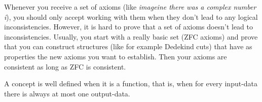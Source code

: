 Whenever you receive a set of axioms (like \emph{imageine there was a complex number i}), you should only accept working with them when they don't lead to any logical inconsistencies. However, it is hard to prove that a set of axioms doesn't lead to inconsistencies. Usually, you start with a really basic set (ZFC axioms) and prove that you can construct structures (like for example Dedekind cuts) that have as properties the new axioms you want to establish. Then your axioms are consistent as long as ZFC is consistent. 

A concept is well defined when it is a function, that is, when for every input-data there is always at most one output-data. 